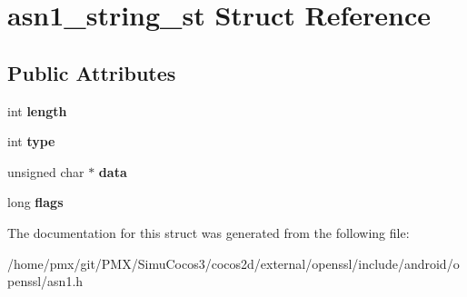 \hypertarget{structasn1__string__st}{}\section{asn1\+\_\+string\+\_\+st Struct Reference}
\label{structasn1__string__st}
\subsection*{Public Attributes}
\begin{DoxyCompactItemize}
\item 
\mbox{\label{structasn1__string__st_a425b332bd4925320832bb18c59f6a9df}} 
int {\bfseries length}
\item 
\mbox{\label{structasn1__string__st_a4bc5c5a5d5cd42ec6108e8bef50e09ad}} 
int {\bfseries type}
\item 
\mbox{\label{structasn1__string__st_a2239f39edaa84f53ea789dbef7ef00f8}} 
unsigned char $\ast$ {\bfseries data}
\item 
\mbox{\label{structasn1__string__st_a166fa78d828cb41bb2499ad411c1774c}} 
long {\bfseries flags}
\end{DoxyCompactItemize}


The documentation for this struct was generated from the following file\+:\begin{DoxyCompactItemize}
\item 
/home/pmx/git/\+P\+M\+X/\+Simu\+Cocos3/cocos2d/external/openssl/include/android/openssl/asn1.\+h\end{DoxyCompactItemize}

